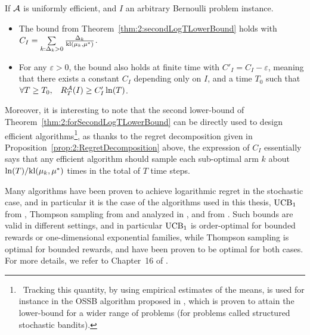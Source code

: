 \begin{theorem}\label{thm:2:forSecondLogTLowerBound}
\begin{leftbarnospace}[theorembar]  %
    If $\mathcal{A}$ is uniformly efficient,
    and $I$ an arbitrary Bernoulli problem instance.
    \begin{itemize}
        \item
        The bound from Theorem~\ref{thm:2:secondLogTLowerBound} holds with
            $C_I = \sum\limits_{k: \Delta_k > 0} \frac{\Delta_k}{\mathrm{kl}(\mu_k, \mu^*)}$.
        \item
        For any $\varepsilon>0$, the bound also holds at finite time with
            $C'_I = C_I - \varepsilon$,
        meaning that there exists a constant $C_I$ depending only on $I$,
        and a time $T_0$ such that $\forall T \geq T_0, \;\;\; R_T^{\mathcal{A}}(I) \geq C'_I \ln(T)$.
    \end{itemize}
\end{leftbarnospace}  %
\end{theorem}

Moreover, it is interesting to note that the second lower-bound of Theorem~\ref{thm:2:forSecondLogTLowerBound} can be directly used to design efficient algorithms\footnote{~Tracking this quantity, by using empirical estimates of the means, is used for instance in the OSSB algorithm proposed in \cite{Combes17}, which is proven to attain the lower-bound for a wider range of problems (for problems called structured stochastic bandits).}, as thanks to the regret decomposition given in Proposition~\ref{prop:2:RegretDecomposition} above, the expression of $C_I$ essentially says that any efficient algorithm
should sample each sub-optimal arm $k$ about $\ln(T)/\mathrm{kl}(\mu_k,\mu^*)$ times in the total of $T$ time steps.


Many algorithms have been proven to achieve logarithmic regret in the stochastic case,
and in particular it is the case of the algorithms used in this thesis, $\mathrm{UCB}_1$ from \cite{Auer02}, Thompson sampling from \cite{Thompson33} and analyzed in \cite{AgrawalGoyal11,Kaufmann12Thompson}, and \klUCB{} from \cite{Garivier11KL,KLUCBJournal}.
%
Such bounds are valid in different settings, and in particular $\mathrm{UCB}_1$ is order-optimal for bounded rewards or one-dimensional exponential families,
while Thompson sampling is optimal for bounded rewards, and \klUCB{} have been proven to be optimal for both cases.
%
For more details, we refer to Chapter~16 of \cite{LattimoreBanditAlgorithmsBook}.


